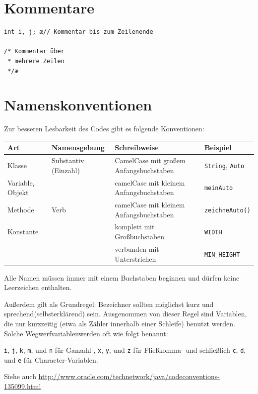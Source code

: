 \section{Kommentare}

\begin{lstlisting}
int i, j; æ// Kommentar bis zum Zeilenende

/* Kommentar über
 * mehrere Zeilen
 */æ
\end{lstlisting}


\section{Namenskonventionen}

Zur besseren Lesbarkeit des Codes gibt es folgende Konventionen:

\begin{tabular}{|l|l|l|l|}\hline
\textbf{Art} & \textbf{Namensgebung} & \textbf{Schreibweise} & \textbf{Beispiel}
\\ \hline
Klasse & Substantiv (Einzahl) & CamelCase mit großem Anfangsbuchstaben &
{\lstinline|String|}, {\lstinline|Auto|} \\ \hline
Variable, Objekt &  & camelCase mit
kleinem Anfangsbuchstaben & {\lstinline|meinAuto|} 
\\ \hline
Methode & Verb & camelCase mit kleinem
Anfangsbuchstaben & {\lstinline|zeichneAuto()|}
\\ \hline
Konstante & & komplett mit Großbuchstaben &
{\lstinline|WIDTH|} 
\\
&& verbunden mit Unterstrichen &  {\lstinline|MIN_HEIGHT|}
\\ \hline
\end{tabular}

Alle Namen müssen immer mit einem Buchstaben beginnen und dürfen keine
Leerzeichen enthalten. 

Außerdem gilt als Grundregel: Bezeichner sollten möglichst kurz und \glqq
sprechend\grqq (selbsterklärend) sein. Ausgenommen von dieser Regel sind
Variablen, die nur kurzzeitig (etwa als Zähler innerhalb einer Schleife) benutzt
werden. Solche \glqq Wegwerfvariablen\grqq werden oft wie folgt benannt:

\lstinline|i|, \lstinline|j|, \lstinline|k|, \lstinline|m|, und \lstinline|n|
für Ganzahl-,  \lstinline|x|, \lstinline|y|, und \lstinline|z| für
Fließkomma- und schließlich \lstinline|c|, \lstinline|d|, und
\lstinline|e| für Character-Variablen.

Siehe auch
\url{http://www.oracle.com/technetwork/java/codeconventions-135099.html}


